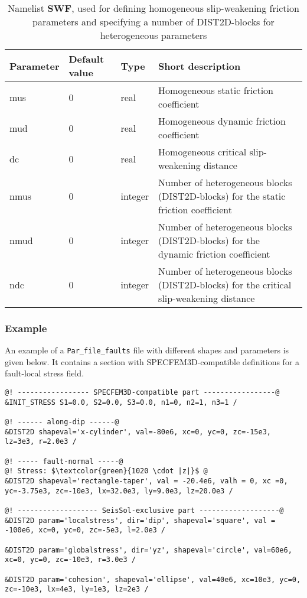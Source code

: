 \documentclass[12pt,twoside]{article}
\begin{document}
\begin{table}[H]
\caption{Namelist \textbf{SWF}, used for defining homogeneous slip-weakening friction parameters
	and specifying a number of DIST2D-blocks for heterogeneous parameters}
\begin{center}
\begin{tabular}{|p{4.8cm}|p{2cm}|p{2cm}|p{5.4cm}|}
\hline
Parameter & Default value & Type & Short description \\
\hline
\hline
mus & 0 & real & Homogeneous static friction coefficient\\
mud & 0 & real & Homogeneous dynamic friction coefficient\\
dc & 0 & real & Homogeneous critical slip-weakening distance\\
nmus & 0 & integer & Number of heterogeneous blocks (DIST2D-blocks) for the static friction coefficient\\
nmud & 0 & integer & Number of heterogeneous blocks (DIST2D-blocks) for the dynamic friction coefficient\\
ndc & 0 & integer & Number of heterogeneous blocks (DIST2D-blocks) for the critical slip-weakening distance\\
\hline
\end{tabular}
\end{center}
\label{SWF-table}
\end{table}

\newpage

\subsubsection{Example}

An example of a \texttt{Par\_file\_faults} file with different shapes and parameters is given below. It contains a section with SPECFEM3D-compatible definitions for a fault-local stress field.

\begin{lstlisting}[mathescape]
@! ----------------- SPECFEM3D-compatible part -----------------@
&INIT_STRESS S1=0.0, S2=0.0, S3=0.0, n1=0, n2=1, n3=1 /

@! ------ along-dip ------@
&DIST2D shapeval='x-cylinder', val=-80e6, xc=0, yc=0, zc=-15e3, lz=3e3, r=2.0e3 /

@! ----- fault-normal -----@
@! Stress: $\textcolor{green}{1020 \cdot |z|}$ @
&DIST2D shapeval='rectangle-taper', val = -20.4e6, valh = 0, xc =0, yc=-3.75e3, zc=-10e3, lx=32.0e3, ly=9.0e3, lz=20.0e3 /

@! ------------------- SeisSol-exclusive part -------------------@
&DIST2D param='localstress', dir='dip', shapeval='square', val = -100e6, xc=0, yc=0, zc=-5e3, l=2.0e3 /

&DIST2D param='globalstress', dir='yz', shapeval='circle', val=60e6, xc=0, yc=0, zc=-10e3, r=3.0e3 /

&DIST2D param='cohesion', shapeval='ellipse', val=40e6, xc=10e3, yc=0, zc=-10e3, lx=4e3, ly=1e3, lz=2e3 /
\end{lstlisting}
\end{document}
